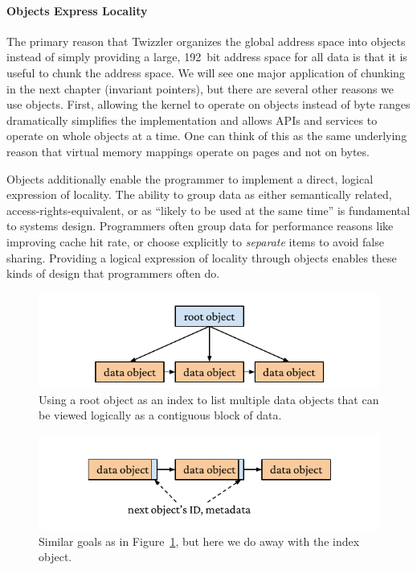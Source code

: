 \paragraph{Objects Express Locality}
The primary reason that Twizzler organizes the global address space into objects instead of simply providing a large,
192~bit address space for all data is that it is useful to chunk the address space. We will see one major application of
chunking in the next chapter (invariant pointers), but there are several other reasons we use objects. First, allowing
the kernel to operate on objects instead of byte ranges dramatically simplifies the implementation and allows APIs and
services to operate on whole objects at a time. One can think of this as the same underlying reason that virtual memory
mappings operate on pages and not on bytes.

Objects additionally enable the programmer to implement a direct, logical expression of locality.
The ability to group data as either semantically related, access-rights-equivalent, or as ``likely to be used at the
same time'' is fundamental to systems design. Programmers often group data for performance reasons like improving cache
hit rate, or choose explicitly to \emph{separate} items to avoid false sharing. Providing a logical expression of
locality through objects enables these kinds of design that programmers often do.
\begin{figure}
    \centering
    \includegraphics[width=\linewidth]{fig/objectchain1.pdf}
    \caption[Chaining objects]{Using a root object as an index to list multiple data objects that can be viewed logically as a contiguous block of data.}
    \label{fig:objchain1}
\end{figure}

\begin{figure}
    \centering
    \includegraphics[width=\linewidth]{fig/objectchain2.pdf}
    \caption[Alternative object chaining]{Similar goals as in Figure~\ref{fig:objchain1}, but here we do away with the index object.}
    \label{fig:objchain2}
\end{figure}
